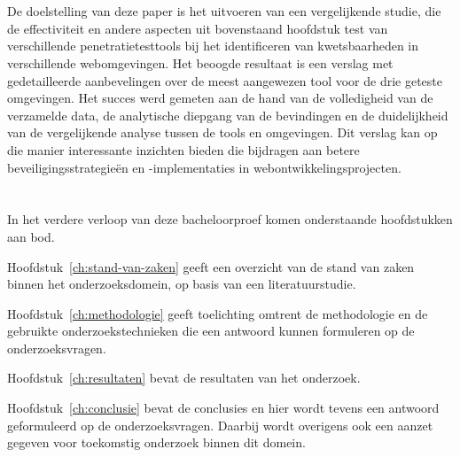 \section{}%
\label{sec:onderzoeksdoelstelling}
De doelstelling van deze paper is het uitvoeren van een vergelijkende studie, die de effectiviteit en andere aspecten uit bovenstaand hoofdstuk 
test van verschillende penetratietesttools bij het identificeren van kwetsbaarheden in verschillende webomgevingen.
Het beoogde resultaat is een verslag met gedetailleerde aanbevelingen over de meest aangewezen tool voor de drie geteste 
omgevingen. Het succes werd gemeten aan de hand van de volledigheid van de verzamelde data, de analytische diepgang van de bevindingen 
en de duidelijkheid van de vergelijkende analyse tussen de tools en omgevingen. Dit verslag kan op die manier interessante inzichten bieden die 
bijdragen aan betere beveiligingsstrategieën en -implementaties in webontwikkelingsprojecten.
\section{}%
\label{sec:opzet-bachelorproef}


In het verdere verloop van deze bacheloorproef komen onderstaande hoofdstukken aan bod.

Hoofdstuk~\ref{ch:stand-van-zaken} geeft een overzicht van de stand van zaken binnen het onderzoeksdomein, op basis van een literatuurstudie.

Hoofdstuk~\ref{ch:methodologie} geeft toelichting omtrent de methodologie en de gebruikte onderzoekstechnieken die een antwoord kunnen formuleren op de onderzoeksvragen.

Hoofdstuk~\ref{ch:resultaten} bevat de resultaten van het onderzoek.

Hoofdstuk~\ref{ch:conclusie} bevat de conclusies en hier wordt tevens een antwoord geformuleerd op de onderzoeksvragen. Daarbij wordt overigens ook een aanzet gegeven voor toekomstig onderzoek binnen dit domein.